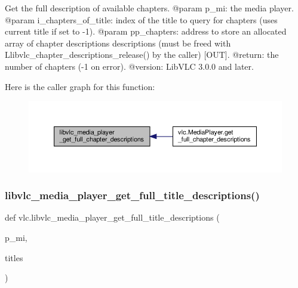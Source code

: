 \begin{DoxyVerb}Get the full description of available chapters.
@param p_mi: the media player.
@param i_chapters_of_title: index of the title to query for chapters (uses current title if set to -1).
@param pp_chapters: address to store an allocated array of chapter descriptions descriptions (must be freed with L{libvlc_chapter_descriptions_release}() by the caller) [OUT].
@return: the number of chapters (-1 on error).
@version: LibVLC 3.0.0 and later.
\end{DoxyVerb}
 Here is the caller graph for this function\+:
\nopagebreak
\begin{figure}[H]
\begin{center}
\leavevmode
\includegraphics[width=350pt]{namespacevlc_adf5d3e952881c8a2d36db4a98bfda4a2_icgraph}
\end{center}
\end{figure}
\mbox{\label{namespacevlc_a61a2bcf2cf564f255a1087a54d5df1b6}} 
\subsubsection{\texorpdfstring{libvlc\+\_\+media\+\_\+player\+\_\+get\+\_\+full\+\_\+title\+\_\+descriptions()}{libvlc\_media\_player\_get\_full\_title\_descriptions()}}
{\footnotesize\ttfamily def vlc.\+libvlc\+\_\+media\+\_\+player\+\_\+get\+\_\+full\+\_\+title\+\_\+descriptions (\begin{DoxyParamCaption}\item[{}]{p\+\_\+mi,  }\item[{}]{titles }\end{DoxyParamCaption})}

